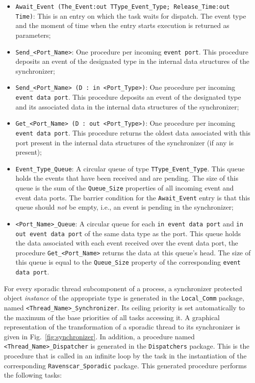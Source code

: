 \begin{itemize}
\item{\texttt{Await\_Event (The\_Event:out TType\_Event\_Type;
    Release\_Time:out Time)}: This is an entry on which the task waits
  for dispatch. The event type and the moment of time when the entry
  starts execution is returned as parameters;}
\item{\texttt{Send\_<Port\_Name>}: One procedure per incoming
  \texttt{event port}. This procedure deposits an event of the
  designated type in the internal data structures of the
  synchronizer;}
\item{\texttt{Send\_<Port\_Name> (D : in <Port\_Type>)}: One
  procedure per incoming \texttt{event data port}. This procedure
  deposits an event of the designated type and its associated data in
  the internal data structures of the synchronizer;}
\item{\texttt{Get\_<Port\_Name> (D : out <Port\_Type>)}: One procedure
  per incoming \texttt{event data port}. This procedure returns the
  oldest data associated with this port present in the internal data
  structures of the synchronizer (if any is present);}
\item{\texttt{Event\_Type\_Queue}: A circular queue of type
  \texttt{TType\_Event\_Type}. This queue holds the events that have
  been received and are pending. The size of this queue is the sum of
  the \texttt{Queue\_Size} properties of all incoming event and event
  data ports. The barrier condition for the \texttt{Await\_Event}
  entry is that this queue should \emph{not} be empty, i.e., an event
  is pending in the synchronizer;}
\item{\texttt{<Port\_Name>\_Queue}: A circular queue for each
  \texttt{in event data port} and \texttt{in out event data port} of
  the same data type as the port. This queue holds the data associated
  with each event received over the event data port, the procedure
  \texttt{Get\_<Port\_Name>} returns the data at this queue's
    head. The size of this queue is equal to the \texttt{Queue\_Size}
    property of the corresponding \texttt{event data port}.}
\end{itemize}

For every sporadic thread subcomponent of a process, a synchronizer
protected object \emph{instance} of the appropriate type is generated
in the \texttt{Local\_Comm} package, named
\texttt{<Thread\_Name>\_Synchronizer}. Its ceiling priority is set
automatically to the maximum of the base priorities of all tasks
accessing it. A graphical representation of the transformation of a
sporadic thread to its synchronizer is given in
Fig.~\ref{fig:synchronizer}. In addition, a procedure named
\texttt{<Thread\_Name>\_Dispatcher} is generated in the
\texttt{Dispatchers} package. This is the procedure that is called in
an infinite loop by the task in the instantiation of the corresponding
\texttt{Ravenscar\_Sporadic} package. This generated procedure
performs the following tasks:

